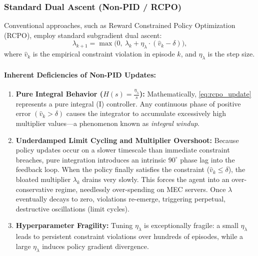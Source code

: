 \documentclass[12pt,a4paper]{article}
\begin{document}
\subsubsection{Standard Dual Ascent (Non-PID / RCPO)}
Conventional approaches, such as Reward Constrained Policy Optimization (RCPO), employ standard subgradient dual ascent:
\begin{equation}
\lambda_{k+1} = \max\Big(0,\ \lambda_k + \eta_{\lambda} \cdot (\hat{v}_k - \delta)\Big),
\label{eq:rcpo_update}
\end{equation}
where $\hat{v}_k$ is the empirical constraint violation in episode $k$, and $\eta_\lambda$ is the step size.

\paragraph{Inherent Deficiencies of Non-PID Updates:}
\begin{enumerate}
    \item \textbf{Pure Integral Behavior ($H(s) = \frac{\eta_\lambda}{s}$):} Mathematically, \eqref{eq:rcpo_update} represents a pure integral (I) controller. Any continuous phase of positive error $(\hat{v}_k > \delta)$ causes the integrator to accumulate excessively high multiplier values—a phenomenon known as \emph{integral windup}.
    \item \textbf{Underdamped Limit Cycling and Multiplier Overshoot:} Because policy updates occur on a slower timescale than immediate constraint breaches, pure integration introduces an intrinsic $90^\circ$ phase lag into the feedback loop. When the policy finally satisfies the constraint ($\hat{v}_k \le \delta$), the bloated multiplier $\lambda_k$ drains very slowly. This forces the agent into an over-conservative regime, needlessly over-spending on MEC servers. Once $\lambda$ eventually decays to zero, violations re-emerge, triggering perpetual, destructive oscillations (limit cycles).
    \item \textbf{Hyperparameter Fragility:} Tuning $\eta_\lambda$ is exceptionally fragile: a small $\eta_\lambda$ leads to persistent constraint violations over hundreds of episodes, while a large $\eta_\lambda$ induces policy gradient divergence.
\end{enumerate}
\end{document}
